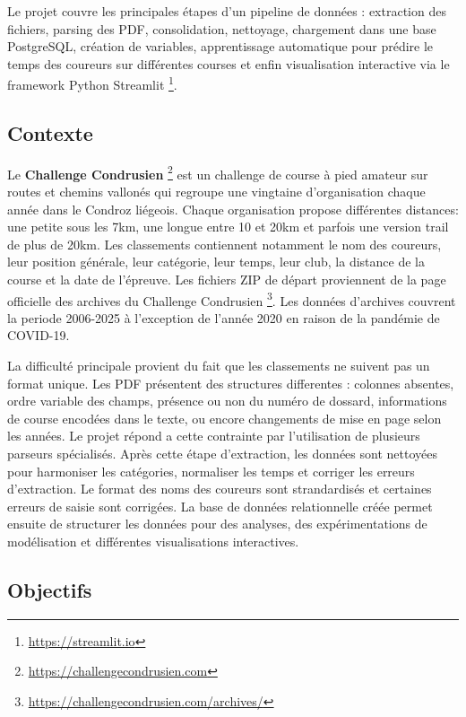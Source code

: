 \documentclass[12pt,a4paper]{article}
\begin{document}
Le projet couvre les principales étapes d'un pipeline de données : extraction des fichiers, parsing des PDF, consolidation, nettoyage, chargement dans une base PostgreSQL, création de variables, apprentissage automatique pour prédire le temps des coureurs sur différentes courses et enfin visualisation interactive via le framework Python Streamlit \footnote{\url{https://streamlit.io}}.

\subsection{Contexte}

Le \textbf{Challenge Condrusien} \footnote{\url{https://challengecondrusien.com}} est un challenge de course à pied amateur sur routes et chemins vallonés qui regroupe une vingtaine d'organisation chaque année dans le Condroz liégeois. Chaque organisation propose différentes distances: une petite sous les 7km, une longue entre 10 et 20km et parfois une version trail de plus de 20km. Les classements contiennent notamment le nom des coureurs, leur position générale, leur catégorie, leur temps, leur club, la distance de la course et la date de l'épreuve. Les fichiers ZIP de départ proviennent de la page officielle des archives du Challenge Condrusien \footnote{\url{https://challengecondrusien.com/archives/}}. Les données d'archives couvrent la periode 2006-2025 à l'exception de l'année 2020 en raison de la pandémie de COVID-19.

La difficulté principale provient du fait que les classements ne suivent pas un format unique. Les PDF présentent des structures differentes : colonnes absentes, ordre variable des champs, présence ou non du numéro de dossard, informations de course encodées dans le texte, ou encore changements de mise en page selon les années. Le projet répond a cette contrainte par l'utilisation de plusieurs parseurs spécialisés. Après cette étape d'extraction, les données sont nettoyées pour harmoniser les catégories, normaliser les temps et corriger les erreurs d'extraction. Le format des noms des coureurs sont strandardisés et certaines erreurs de saisie sont corrigées. La base de données relationnelle créée permet ensuite de structurer les données pour des analyses, des expérimentations de modélisation et différentes visualisations interactives.

\subsection{Objectifs}
\end{document}
